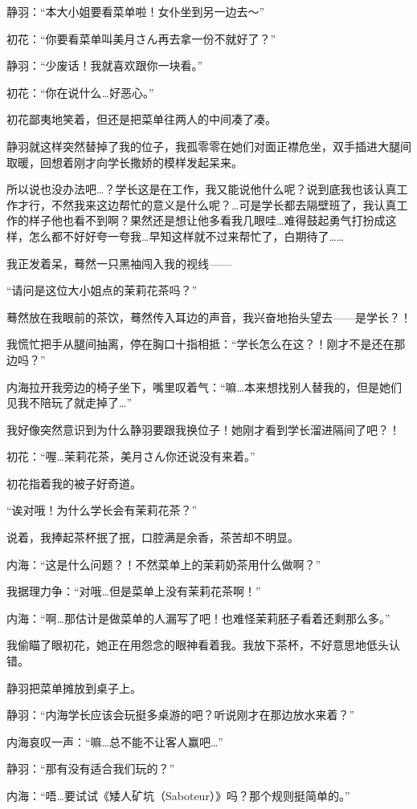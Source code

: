 静羽：“本大小姐要看菜单啦！女仆坐到另一边去～”

初花：“你要看菜单叫美月さん再去拿一份不就好了？”

静羽：“少废话！我就喜欢跟你一块看。”

初花：“你在说什么…好恶心。”

初花鄙夷地笑着，但还是把菜单往两人的中间凑了凑。

静羽就这样突然替掉了我的位子，我孤零零在她们对面正襟危坐，双手插进大腿间取暖，回想着刚才向学长撒娇的模样发起呆来。

所以说也没办法吧…？学长这是在工作，我又能说他什么呢？说到底我也该认真工作才行，不然我来这边帮忙的意义是什么呢？…可是学长都去隔壁班了，我认真工作的样子他也看不到啊？果然还是想让他多看我几眼哇…难得鼓起勇气打扮成这样，怎么都不好好夸一夸我…早知这样就不过来帮忙了，白期待了……

我正发着呆，蓦然一只黑袖闯入我的视线——

“请问是这位大小姐点的茉莉花茶吗？”

蓦然放在我眼前的茶饮，蓦然传入耳边的声音，我兴奋地抬头望去——是学长？！

我慌忙把手从腿间抽离，停在胸口十指相抵：“学长怎么在这？！刚才不是还在那边吗？”

内海拉开我旁边的椅子坐下，嘴里叹着气：“嘛…本来想找别人替我的，但是她们见我不陪玩了就走掉了…”

我好像突然意识到为什么静羽要跟我换位子！她刚才看到学长溜进隔间了吧？！

初花：“喔…茉莉花茶，美月さん你还说没有来着。”

初花指着我的被子好奇道。

“诶对哦！为什么学长会有茉莉花茶？”

说着，我捧起茶杯抿了抿，口腔满是余香，茶苦却不明显。

内海：“这是什么问题？！不然菜单上的茉莉奶茶用什么做啊？”

我据理力争：“对哦…但是菜单上没有茉莉花茶啊！”

内海：“啊…那估计是做菜单的人漏写了吧！也难怪茉莉胚子看着还剩那么多。”

我偷瞄了眼初花，她正在用怨念的眼神看着我。我放下茶杯，不好意思地低头认错。

静羽把菜单摊放到桌子上。

静羽：“内海学长应该会玩挺多桌游的吧？听说刚才在那边放水来着？”

内海哀叹一声：“嘛…总不能不让客人赢吧…”

静羽：“那有没有适合我们玩的？”

内海：“唔…要试试《矮人矿坑（Saboteur）》吗？那个规则挺简单的。”

